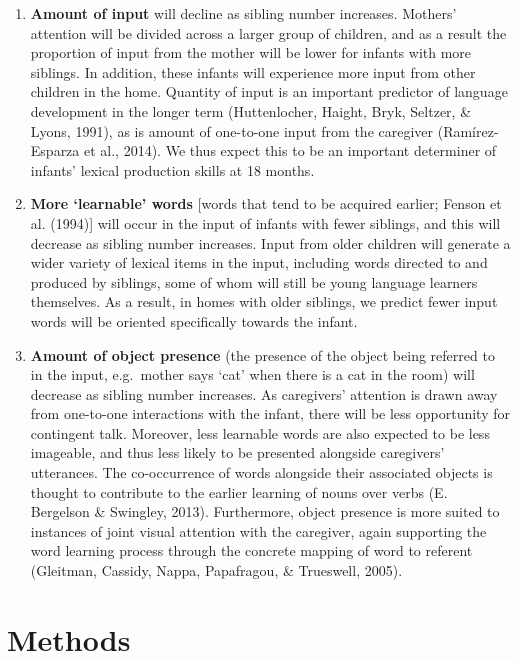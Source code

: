 \documentclass[
  english,
  man,floatsintext]{apa6}
\begin{document}
\begin{enumerate}
\def\labelenumi{\arabic{enumi})}
\item
  \textbf{Amount of input} will decline as sibling number increases. Mothers' attention will be divided across a larger group of children, and as a result the proportion of input from the mother will be lower for infants with more siblings. In addition, these infants will experience more input from other children in the home. Quantity of input is an important predictor of language development in the longer term (Huttenlocher, Haight, Bryk, Seltzer, \& Lyons, 1991), as is amount of one-to-one input from the caregiver (Ramírez-Esparza et al., 2014). We thus expect this to be an important determiner of infants' lexical production skills at 18 months.
\item
  \textbf{More `learnable' words} {[}words that tend to be acquired earlier; Fenson et al. (1994){]} will occur in the input of infants with fewer siblings, and this will decrease as sibling number increases. Input from older children will generate a wider variety of lexical items in the input, including words directed to and produced by siblings, some of whom will still be young language learners themselves. As a result, in homes with older siblings, we predict fewer input words will be oriented specifically towards the infant.
\item
  \textbf{Amount of object presence} (the presence of the object being referred to in the input, e.g.~mother says `cat' when there is a cat in the room) will decrease as sibling number increases. As caregivers' attention is drawn away from one-to-one interactions with the infant, there will be less opportunity for contingent talk. Moreover, less learnable words are also expected to be less imageable, and thus less likely to be presented alongside caregivers' utterances. The co-occurrence of words alongside their associated objects is thought to contribute to the earlier learning of nouns over verbs (E. Bergelson \& Swingley, 2013). Furthermore, object presence is more suited to instances of joint visual attention with the caregiver, again supporting the word learning process through the concrete mapping of word to referent (Gleitman, Cassidy, Nappa, Papafragou, \& Trueswell, 2005).
\end{enumerate}

\hypertarget{methods}{%
\section{Methods}\label{methods}}
\end{document}
